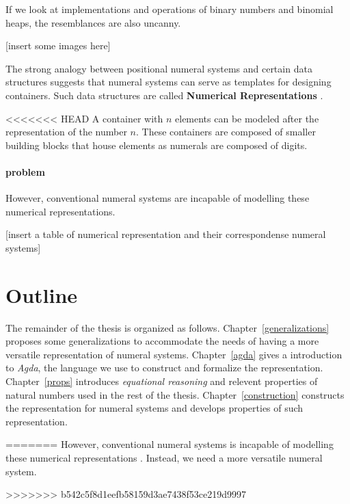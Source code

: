 \documentclass[../thesis.tex]{subfiles}
\begin{document}
If we look at implementations and operations of binary numbers and binomial
heaps, the resemblances are also uncanny.

[insert some images here]

The strong analogy between positional numeral systems and certain data structures
suggests that numeral systems can serve as templates for designing containers.
Such data structures are called \textbf{Numerical Representations}\cite{okasaki1996purely}
\cite{hinze1998numerical}.

<<<<<<< HEAD
A container with $ n $ elements can be modeled after the representation of the number $ n $.
These containers are composed of smaller building blocks that house elements
as numerals are composed of digits.

\paragraph{problem}
However, conventional numeral systems are incapable of modelling these numerical
representations.

[insert a table of numerical representation and their correspondense numeral systems]

\section{Outline}
The remainder of the thesis is organized as follows.
Chapter~\ref{generalizations} proposes some generalizations to accommodate the
needs of having a more versatile representation of numeral systems.
Chapter~\ref{agda} gives a introduction to \textit{Agda}, the language we use to
construct and formalize the representation.
Chapter~\ref{props} introduces \textit{equational reasoning} and relevent properties
of natural numbers used in the rest of the thesis.
Chapter~\ref{construction} constructs the representation for numeral systems and
develops properties of such representation.

=======
However, conventional numeral systems is incapable of modelling these numerical
representations . Instead, we need a more versatile numeral system.

>>>>>>> b542c5f8d1eefb58159d3ae7438f53ce219d9997
\end{document}
